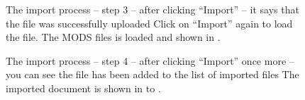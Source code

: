 \begin{figure}[!ht]
  \begin{center}
  \end{center}
  \caption[The import process – step 3]{The import process – step 3 – after clicking “Import” – it says that the file was successfully uploaded
Click on “Import” again to load the file. The MODS files is loaded and shown in .}
  \label{fig:divaImport3}
\end{figure}
\FloatBarrier

\begin{figure}[!ht]
  \begin{center}
  \end{center}
  \caption[The import process – step 4]{The import process – step 4 – after clicking “Import” once more – you can see the file has been added to the list of imported files The imported document is shown in  to .}
  \label{fig:divaImport4}
\end{figure}
\FloatBarrier


